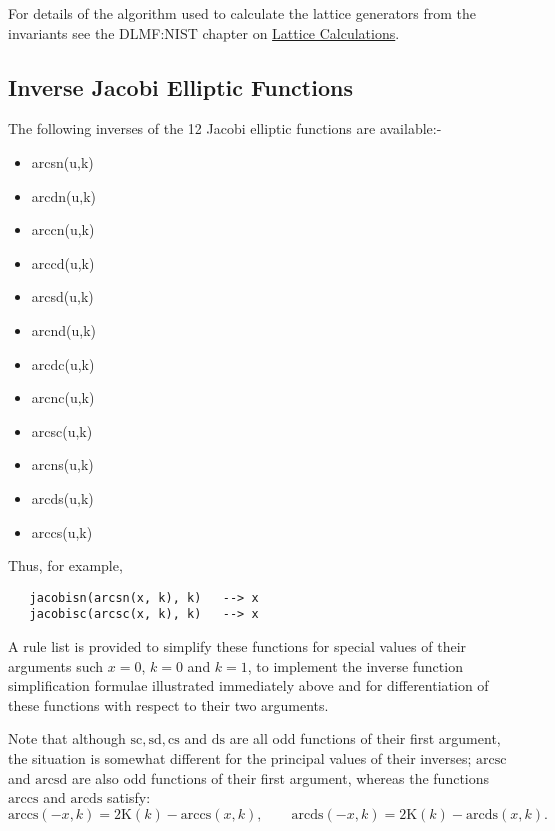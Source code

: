 For details of the algorithm used to calculate the lattice generators from the
invariants see the DLMF:NIST chapter on
\href{https://dlmf.nist.gov/23.22#ii}{Lattice Calculations}.

\subsection{Inverse Jacobi Elliptic Functions}
The following inverses of the 12 Jacobi elliptic functions are available:-
\hypertarget{INVELL}{}
\hypertarget{operator:ARCSN}{}
\hypertarget{operator:ARCCN}{}
\hypertarget{operator:ARCDN}{}
\hypertarget{operator:ARCCD}{}
\hypertarget{operator:ARCSD}{}
\hypertarget{operator:ARCND}{}
\hypertarget{operator:ARCDC}{}
\hypertarget{operator:ARCNC}{}
\hypertarget{operator:ARCSC}{}
\hypertarget{operator:ARCNS}{}
\hypertarget{operator:ARCDS}{}
\hypertarget{operator:ARCCS}{}
\begin{itemize}
\item arcsn(u,k)
\item arcdn(u,k)
\item arccn(u,k)
\item arccd(u,k)
\item arcsd(u,k)
\item arcnd(u,k)
\item arcdc(u,k)
\item arcnc(u,k)
\item arcsc(u,k)
\item arcns(u,k)
\item arcds(u,k)
\item arccs(u,k)
\end{itemize}

Thus, for example,
\begin{verbatim}
   jacobisn(arcsn(x, k), k)   --> x
   jacobisc(arcsc(x, k), k)   --> x
\end{verbatim}

A rule list is provided to simplify these functions for special values of their
arguments such $x=0$, $k=0$ and $k=1$, to implement the inverse function
simplification formulae illustrated immediately above and for differentiation
of these functions with respect to their two arguments.

Note that although $\mathrm{sc}, \mathrm{sd}, \mathrm{cs}$ and $\mathrm{ds}$
are all odd functions of their first argument, the situation is somewhat
different for the principal values of their inverses;  $\mathrm{arcsc}$ and
$\mathrm{arcsd}$ are also odd functions of their first argument, whereas
the functions $\mathrm{arccs}$ and $\mathrm{arcds}$ satisfy:
\[ \mathrm{arccs}(-x, k) = 2\mathrm{K}(k)-\mathrm{arccs}(x, k),\qquad
\mathrm{arcds}(-x, k) = 2\mathrm{K}(k)-\mathrm{arcds}(x, k).\]

